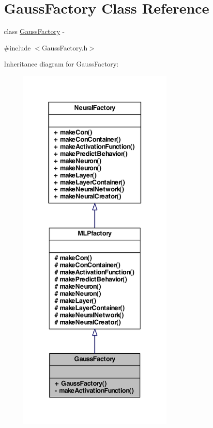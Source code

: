 \hypertarget{class_gauss_factory}{
\section{GaussFactory Class Reference}
\label{class_gauss_factory}
}


class \hyperlink{class_gauss_factory}{GaussFactory} -\/  




{\ttfamily \#include $<$GaussFactory.h$>$}



Inheritance diagram for GaussFactory:
\nopagebreak
\begin{figure}[H]
\begin{center}
\leavevmode
\includegraphics[width=222pt]{class_gauss_factory__inherit__graph}
\end{center}
\end{figure}


